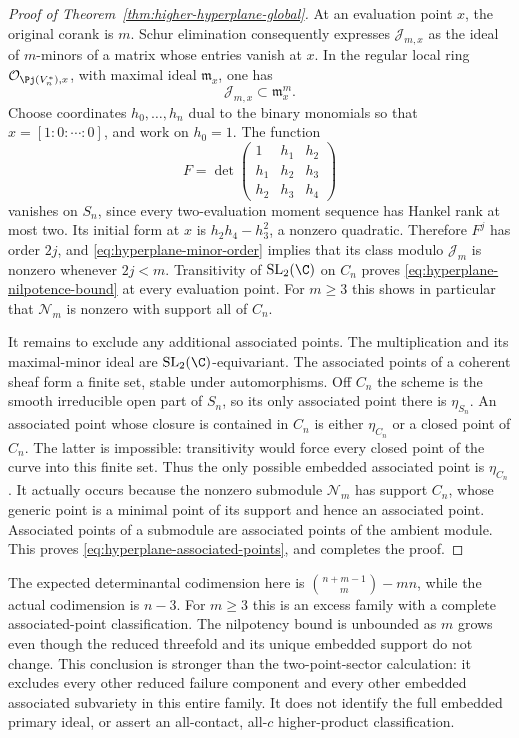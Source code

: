 \begin{proof}[Proof of Theorem~\ref{thm:higher-hyperplane-global}]
At an evaluation point $x$, the original corank is $m$. Schur
elimination consequently expresses $\mathcal J_{m,x}$ as the ideal
of $m$-minors of a matrix whose entries vanish at $x$. In the regular
local ring $\mathcal O_{\Pj(V_n^*),x}$, with maximal ideal
$\mathfrak m_x$, one has
\begin{equation}\label{eq:hyperplane-minor-order}
 \mathcal J_{m,x}\subset\mathfrak m_x^m.
\end{equation}
Choose coordinates $h_0,\ldots,h_n$ dual to the binary monomials
so that $x=[1:0:\cdots:0]$, and work on $h_0=1$. The function
\[
 F=\det\begin{pmatrix}1&h_1&h_2\\h_1&h_2&h_3\\h_2&h_3&h_4\end{pmatrix}
\]
vanishes on $S_n$, since every two-evaluation moment sequence has
Hankel rank at most two. Its initial form at $x$ is
$h_2h_4-h_3^2$, a nonzero quadratic. Therefore $F^j$ has order
$2j$, and \eqref{eq:hyperplane-minor-order} implies that its class
modulo $\mathcal J_m$ is nonzero whenever $2j<m$.
Transitivity of $\operatorname{SL}_2(\C)$ on $C_n$ proves
\eqref{eq:hyperplane-nilpotence-bound} at every evaluation point.
For $m\ge3$ this shows in particular that $\mathcal N_m$ is nonzero
with support all of $C_n$.

It remains to exclude any additional associated points. The
multiplication and its maximal-minor ideal are
$\operatorname{SL}_2(\C)$-equivariant. The associated points of a
coherent sheaf form a finite set, stable under automorphisms.
Off $C_n$ the scheme is the smooth irreducible open part of $S_n$,
so its only associated point there is $\eta_{S_n}$. An associated
point whose closure is contained in $C_n$ is either $\eta_{C_n}$
or a closed point of $C_n$. The latter is impossible: transitivity
would force every closed point of the curve into this finite set.
Thus the only possible embedded associated point is $\eta_{C_n}$.
It actually occurs because the nonzero submodule $\mathcal N_m$
has support $C_n$, whose generic point is a minimal point of its
support and hence an associated point. Associated points of a
submodule are associated points of the ambient module. This proves
\eqref{eq:hyperplane-associated-points}, and completes the proof.
\end{proof}

The expected determinantal codimension here is
$\binom{n+m-1}{m}-mn$, while the actual codimension is $n-3$.
For $m\ge3$ this is an excess family with a complete associated-point
classification. The nilpotency bound is unbounded as $m$ grows even
though the reduced threefold and its unique embedded support do not
change. This conclusion is stronger than the two-point-sector
calculation: it excludes every other reduced failure component and
every other embedded associated subvariety in this entire family.
It does not identify the full embedded primary ideal, or assert an
all-contact, all-$c$ higher-product classification.
